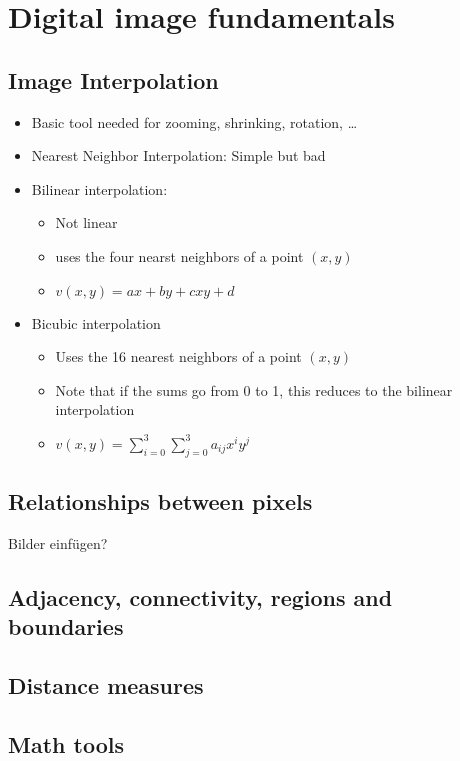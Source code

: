 \section{Digital image fundamentals}
\subsection{Image Interpolation}
\begin{itemize}
  \item Basic tool needed for zooming, shrinking, rotation, \ldots
  \item Nearest Neighbor Interpolation: Simple but bad
  \item Bilinear interpolation:
  	\begin{itemize}
  	  \item Not linear
  	  \item uses the four nearst neighbors of a point $(x,y)$
  	  \item $v(x,y) = ax + by + cxy + d$
  	\end{itemize}
  \item Bicubic interpolation
	\begin{itemize}
  	  \item Uses the 16 nearest neighbors of a point $(x,y)$
  	  \item Note that if the sums go from 0 to 1, this reduces to the bilinear interpolation
  	  \item $v(x,y) = \sum\limits_{i=0}^3\sum\limits_{j=0}^3 a_{ij}x^iy^j$
  	\end{itemize}
\end{itemize}

\subsection{Relationships between pixels}
Bilder einfügen?

\subsection{Adjacency, connectivity, regions and boundaries}

\subsection{Distance measures}

\subsection{Math tools}